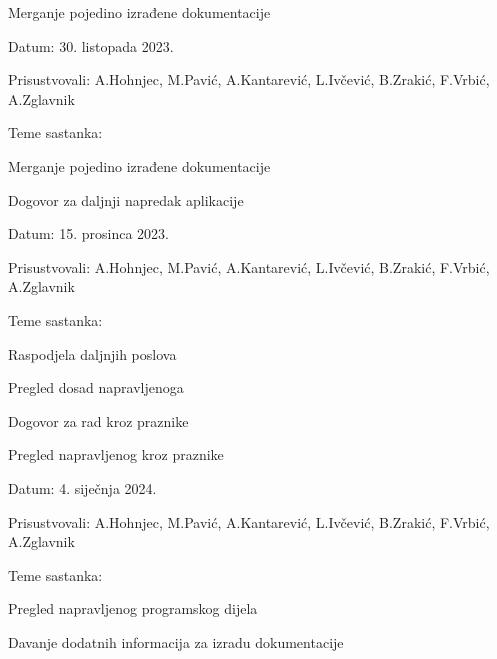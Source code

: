 \begin{packed_enum}
			\item  Merganje pojedino izrađene dokumentacije
			
			\item[] \begin{packed_item}
				\item Datum: 30. listopada 2023.
				\item Prisustvovali: A.Hohnjec, M.Pavić, A.Kantarević, L.Ivčević, B.Zrakić, F.Vrbić, A.Zglavnik
				\item Teme sastanka:
				\begin{packed_item}
					\item  Merganje pojedino izrađene dokumentacije
				\end{packed_item}
			\end{packed_item}
			
				\item  Dogovor za daljnji napredak aplikacije
			
			\item[] \begin{packed_item}
				\item Datum: 15. prosinca 2023.
				\item Prisustvovali: A.Hohnjec, M.Pavić, A.Kantarević, L.Ivčević, B.Zrakić, F.Vrbić, A.Zglavnik
				\item Teme sastanka:
				\begin{packed_item}
					\item  Raspodjela daljnjih poslova
					\item  Pregled dosad napravljenoga
					\item  Dogovor za rad kroz praznike
				\end{packed_item}
			\end{packed_item}
			
				\item  Pregled napravljenog kroz praznike
			
			\item[] \begin{packed_item}
				\item Datum: 4. siječnja 2024.
				\item Prisustvovali: A.Hohnjec, M.Pavić, A.Kantarević, L.Ivčević, B.Zrakić, F.Vrbić, A.Zglavnik
				\item Teme sastanka:
				\begin{packed_item}
					\item  Pregled napravljenog programskog dijela
					\item  Davanje dodatnih informacija za izradu dokumentacije
				\end{packed_item}
			\end{packed_item}
			

\end{packed_enum}
